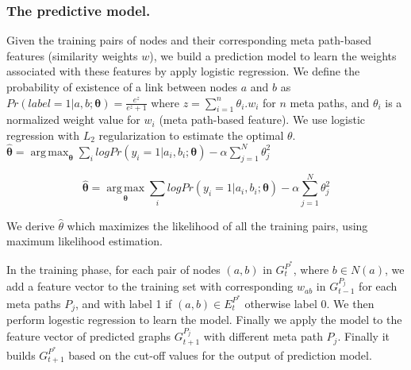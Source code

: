 




\subsubsection{The predictive model.} Given the training pairs of nodes and their corresponding meta path-based features (similarity weights $w$), we build a prediction model to learn the weights associated with these features by apply logistic regression. We define the probability of existence of a link between nodes $a$ and $b$ as 
$Pr(label = 1|a, b; \boldsymbol{\theta}) = \frac{e^{z}}{e^{z}+1}$
where $z=\sum\limits_{i=1}^{n}\theta_i.w_i$ for $n$ meta paths, and $\theta_i$ is a normalized weight value for $w_i$ (meta path-based feature). We use logistic regression with $L_2$ regularization to estimate the optimal $\theta$. 
$\boldsymbol{\hat{\theta}} = 
\operatorname*{arg\,max}_{\boldsymbol{\theta}}\sum_i log Pr(y_i = 1|a_i, b_i; \boldsymbol{\theta}) - \alpha \sum_{j=1}^N \theta_j^2
$

\begin{equation*}
\boldsymbol{\hat{\theta}} = 
\operatorname*{arg\,max}_{\boldsymbol{\theta}}\sum_i log Pr(y_i = 1|a_i, b_i; \boldsymbol{\theta}) - \alpha \sum_{j=1}^N \theta_j^2
\end{equation*}

We derive \textbf{$\hat{\theta}$} which maximizes the likelihood of all the training pairs, using maximum likelihood estimation.


In the training phase, for each pair of nodes $(a,b)$ in $G^{P^*}_{t}$, where $b \in N(a)$, we add a feature vector to the training set with corresponding $w_{ab}$ in $G^{P_j}_{t-1}$ for each meta paths $P_j$, and with label 1 if $(a,b) \in E^{P^*}_{t}$ otherwise label 0. We then perform logestic regression to learn the model. Finally we apply the model to the feature vector of predicted graphs $G^{P_j}_{t+1}$ with different meta path $P_j$. Finally it builds $G^{P^*}_{t+1}$ based on the cut-off values for the output of prediction model.


